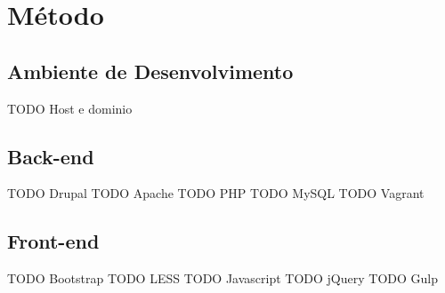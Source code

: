 \chapter{Método}

\section{Ambiente de Desenvolvimento}

TODO Host e dominio





\section{Back-end}

TODO Drupal
TODO Apache
TODO PHP
TODO MySQL
TODO Vagrant

\section{Front-end}

TODO Bootstrap
TODO LESS
TODO Javascript
TODO jQuery
TODO Gulp

